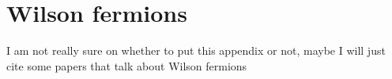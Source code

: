 \chapter{Wilson fermions}
\label{AppendixB}
I am not really sure on whether to put this appendix or not, maybe I will just cite some papers that talk about Wilson fermions
